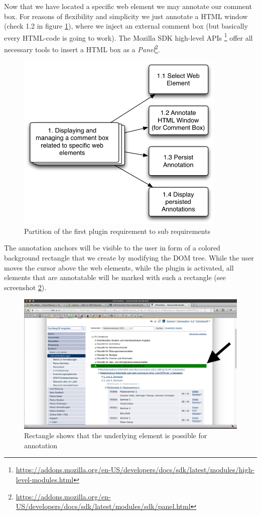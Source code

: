 Now that we have located a specific web element we may annotate our comment box. For reasons of flexibility and simplicity we just annotate a HTML window (check 1.2 in figure \ref{abstract2concrete-1}), where we inject an external comment box (but basically every HTML-code is going to work). The Mozilla SDK high-level APIs \footnote{\url{https://addons.mozilla.org/en-US/developers/docs/sdk/latest/modules/high-level-modules.html}} offer all necessary tools to insert a HTML box as a \emph{Panel}\footnote{\url{https://addons.mozilla.org/en-US/developers/docs/sdk/latest/modules/sdk/panel.html}}.

\begin{figure}\centering
		\includegraphics[width=10cm]{images/abstract2concrete-1.png}
		\caption{Partition of the first plugin requirement to sub requirements}
		\label{abstract2concrete-1}
\end{figure} 

The annotation anchors will be visible to the user in form of a colored background rectangle that we create by modifying the DOM tree. While the user moves the cursor above the web elements, while the plugin is activated, all elements that are annotatable will be marked with such a rectangle (see screenshot \ref{annotation-rectangle-sample}). 

\begin{figure} \centering
		\includegraphics[width=12cm]{images/annotation-rectangle-sample.png}
		\caption{Rectangle shows that the underlying element is possible for annotation}
		\label{annotation-rectangle-sample}
\end{figure} 

